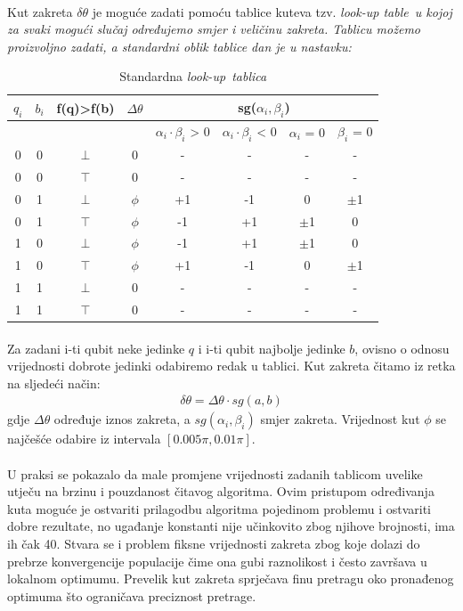 \documentclass[times, utf8, zavrsni, numeric]{fer}
\begin{document}
\paragraph{}
Kut zakreta $\delta\theta$ je moguće zadati pomoću tablice kuteva tzv. \it look-up table\rm\ u kojoj za svaki mogući slučaj određujemo smjer i veličinu zakreta. Tablicu možemo proizvoljno zadati, a standardni oblik tablice dan je u nastavku:
\begin{table}[htb]
\caption{Standardna \it look-up\rm\ tablica}
\label{tbl:lookup}
\centering
\begin{tabular}{|c|c|c|c|c|c|c|c|} 
\hline
$q_i$ & $b_i$ & f(q)>f(b) & $\Delta\theta$ & \multicolumn{4}{|c|}{sg($\alpha_i, \beta_i$)} \\
\hline
&&&& $\alpha_i\cdot\beta_i$ > 0 & $\alpha_i\cdot\beta_i$ < 0 & $\alpha_i$ = 0 & $\beta_i$ = 0 \\
\hline
0 & 0 & $\bot$ & 0 & - & - & - & - \\
0 & 0 & $\top$ & 0 & - & - & - & - \\
0 & 1 & $\bot$ & $\phi$ & +1 & -1 & 0 & $\pm$1 \\
0 & 1 & $\top$ & $\phi$ & -1 & +1 & $\pm$1 & 0 \\
1 & 0 & $\bot$ & $\phi$ & -1 & +1 & $\pm$1 & 0 \\
1 & 0 & $\top$ & $\phi$ & +1 & -1 & 0 & $\pm$1 \\
1 & 1 & $\bot$ & 0 & - & - & - & - \\
1 & 1 & $\top$ & 0 & - & - & - & - \\
\hline
\end{tabular}
\end{table}
\paragraph{}
Za zadani i-ti qubit neke jedinke $q$ i i-ti qubit najbolje jedinke $b$, ovisno o odnosu vrijednosti dobrote jedinki odabiremo redak u tablici.
Kut zakreta čitamo iz retka na sljedeći način:
\begin{align*}
\delta\theta = \Delta\theta \cdot sg(a,b)
\end{align*}
gdje $\Delta\theta$ određuje iznos zakreta, a $sg(\alpha_i, \beta_i)$ smjer zakreta. Vrijednost kut $\phi$ se najčešće odabire iz intervala $[0.005\pi, 0.01\pi]$.

\paragraph{}
U praksi se pokazalo da male promjene vrijednosti zadanih tablicom uvelike utječu na brzinu i pouzdanost čitavog algoritma. Ovim pristupom određivanja kuta moguće je ostvariti prilagodbu algoritma pojedinom problemu i ostvariti dobre rezultate, no ugađanje konstanti nije učinkovito zbog njihove brojnosti, ima ih čak 40. Stvara se i problem fiksne vrijednosti zakreta zbog koje dolazi do prebrze konvergencije populacije čime ona gubi raznolikost i često završava u lokalnom optimumu. Prevelik kut zakreta sprječava finu pretragu oko pronađenog optimuma što ograničava preciznost pretrage.
\end{document}
